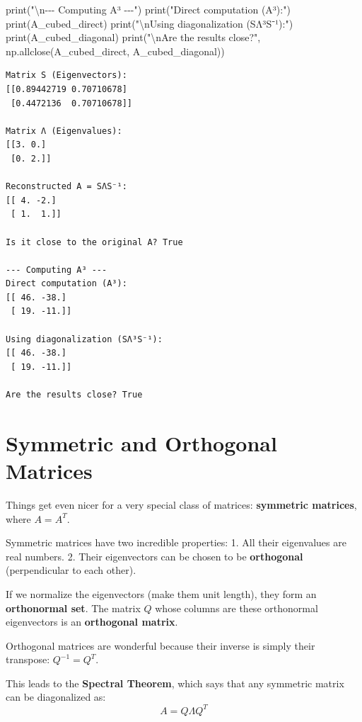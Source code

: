 \documentclass[
  letterpaper,
  DIV=11,
  numbers=noendperiod]{scrreprt}
\newenvironment{Shaded}{\begin{snugshade}}{\end{snugshade}}
\newcommand{\BuiltInTok}[1]{\textcolor[rgb]{0.00,0.23,0.31}{#1}}
\newcommand{\CharTok}[1]{\textcolor[rgb]{0.13,0.47,0.30}{#1}}
\newcommand{\NormalTok}[1]{\textcolor[rgb]{0.00,0.23,0.31}{#1}}
\newcommand{\StringTok}[1]{\textcolor[rgb]{0.13,0.47,0.30}{#1}}
\begin{document}
\begin{Shaded}
\begin{Highlighting}[]
\BuiltInTok{print}\NormalTok{(}\StringTok{"}\CharTok{\textbackslash{}n}\StringTok{{-}{-}{-} Computing A³ {-}{-}{-}"}\NormalTok{)}
\BuiltInTok{print}\NormalTok{(}\StringTok{"Direct computation (A³):"}\NormalTok{)}
\BuiltInTok{print}\NormalTok{(A\_cubed\_direct)}
\BuiltInTok{print}\NormalTok{(}\StringTok{"}\CharTok{\textbackslash{}n}\StringTok{Using diagonalization (SΛ³S⁻¹):"}\NormalTok{)}
\BuiltInTok{print}\NormalTok{(A\_cubed\_diagonal)}
\BuiltInTok{print}\NormalTok{(}\StringTok{"}\CharTok{\textbackslash{}n}\StringTok{Are the results close?"}\NormalTok{, np.allclose(A\_cubed\_direct, A\_cubed\_diagonal))}
\end{Highlighting}
\end{Shaded}

\begin{verbatim}
Matrix S (Eigenvectors):
[[0.89442719 0.70710678]
 [0.4472136  0.70710678]]

Matrix Λ (Eigenvalues):
[[3. 0.]
 [0. 2.]]

Reconstructed A = SΛS⁻¹:
[[ 4. -2.]
 [ 1.  1.]]

Is it close to the original A? True

--- Computing A³ ---
Direct computation (A³):
[[ 46. -38.]
 [ 19. -11.]]

Using diagonalization (SΛ³S⁻¹):
[[ 46. -38.]
 [ 19. -11.]]

Are the results close? True
\end{verbatim}

\section{Symmetric and Orthogonal
Matrices}\label{symmetric-and-orthogonal-matrices}

Things get even nicer for a very special class of matrices:
\textbf{symmetric matrices}, where \(A = A^T\).

Symmetric matrices have two incredible properties: 1. All their
eigenvalues are real numbers. 2. Their eigenvectors can be chosen to be
\textbf{orthogonal} (perpendicular to each other).

If we normalize the eigenvectors (make them unit length), they form an
\textbf{orthonormal set}. The matrix \(Q\) whose columns are these
orthonormal eigenvectors is an \textbf{orthogonal matrix}.

Orthogonal matrices are wonderful because their inverse is simply their
transpose: \(Q^{-1} = Q^T\).

This leads to the \textbf{Spectral Theorem}, which says that any
symmetric matrix can be diagonalized as: \[ A = Q \Lambda Q^T \]
\end{document}
